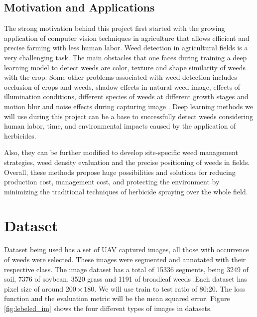 \documentclass{report}
\begin{document}
\subsection{Motivation and Applications}
The strong motivation behind this project first started with the growing application of computer vision techniques in agriculture that allows efficient and precise farming with less human labor. Weed detection in agricultural fields is a very challenging task. The main obstacles that one faces during training a deep learning model to detect weeds are color, texture and shape similarity of weeds with the crop. Some other problems associated with weed detection includes occlusion of crops and weeds, shadow effects in natural weed image, effects of illumination conditions, different species of weeds at different growth stages and motion blur and noise effects during capturing image \cite{hasan2021survey}. Deep learning methods we will use during this project can be a base to successfully detect weeds considering human labor, time, and environmental impacts caused by the application of herbicides.\par
Also, they can be further modified to develop site-specific weed management strategies, weed density evaluation and the precise positioning of weeds in fields. Overall, these methods propose huge possibilities and solutions for reducing production cost, management cost, and protecting the environment by minimizing the traditional techniques of herbicide spraying over the whole field.

\section{Dataset}
Dataset being used has a set of UAV captured images, all those with occurrence of weeds were selected. These images were segmented and annotated with their respective class. The image dataset has a total of 15336 segments, being 3249 of soil, 7376 of soybean, 3520 grass and 1191 of broadleaf weeds \cite{kaggle}.Each dataset has pixel size of around $200\times180$. We will use train to test ratio of 80:20. The loss function and the evaluation metric will be the mean squared error. Figure \ref{fig:lebeled_im} shows the four different types of images in datasets.
\end{document}
